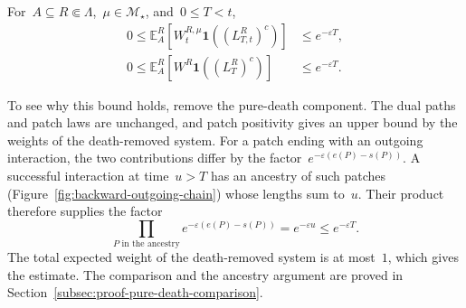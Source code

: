 \documentclass[EJP,preprint,NODS,nobera]{ejpecp}
\newcommand{\E}{\mathbb{E}}
\newcommand{\bb}[1]{\left(#1\right)}
\newcommand{\Cb}[1]{\left[#1\right]}
\newcommand{\ind}{\mathbf{1}}
\begin{document}
{\color{red}
\begin{lemma}
\label{lem:late-interactions}
For~$A\subseteq R\Subset\Lambda$,~$\mu\in\mathcal M_\star$, and~$0\leq T<t$,
\begin{align}
0\leq\E_A^R\Cb{W_t^{R,\mu}\ind\bb{(L_{T,t}^R)^c}}
&\leq e^{-\varepsilon T},
\label{eq:finite-late-interaction-bound}\\
0\leq\E_A^R\Cb{W^R\ind\bb{(L_T^R)^c}}
&\leq e^{-\varepsilon T}.
\label{eq:limiting-late-interaction-bound}
\end{align}
\end{lemma}
}

{\color{red}
To see why this bound holds, remove the pure-death component. The dual paths
and patch laws are unchanged, and patch positivity gives an upper bound by
the weights of the death-removed system. For a patch ending with an outgoing interaction, the two
contributions differ by the factor~$e^{-\varepsilon(e(P)-s(P))}$.
A successful interaction at time~$u>T$ has an ancestry of such patches
(Figure~\ref{fig:backward-outgoing-chain}) whose lengths sum to~$u$. Their product therefore supplies the factor
\begin{equation*}
\prod_{P\text{ in the ancestry}}
e^{-\varepsilon(e(P)-s(P))}=e^{-\varepsilon u}\leq e^{-\varepsilon T}.
\end{equation*}
The total expected weight of the death-removed system is at most~$1$,
which gives the estimate. The comparison and the ancestry argument are
proved in Section~\ref{subsec:proof-pure-death-comparison}.
}
\end{document}
